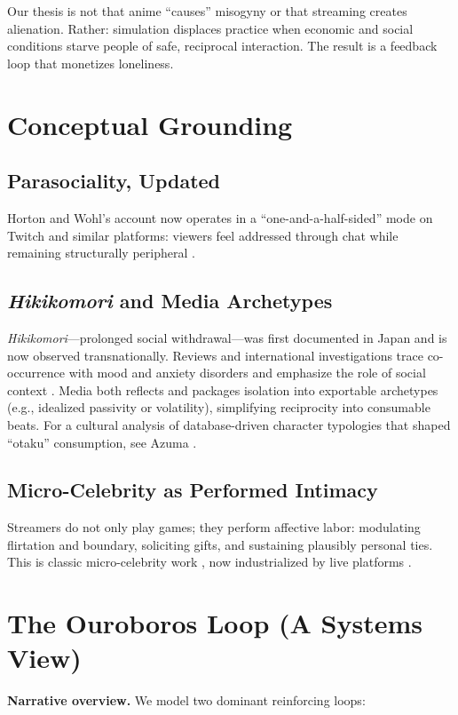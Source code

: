 \documentclass[12pt]{article}
\begin{document}
Our thesis is not that anime ``causes'' misogyny or that streaming creates alienation. Rather: simulation displaces practice when economic and social conditions starve people of safe, reciprocal interaction. The result is a feedback loop that monetizes loneliness.

\section{Conceptual Grounding}

\subsection{Parasociality, Updated}
Horton and Wohl's account now operates in a ``one-and-a-half-sided'' mode on Twitch and similar platforms: viewers feel addressed through chat while remaining structurally peripheral \cite{horton1956,taylor2018}.

\subsection{\emph{Hikikomori} and Media Archetypes}
\emph{Hikikomori}---prolonged social withdrawal---was first documented in Japan and is now observed transnationally. Reviews and international investigations trace co-occurrence with mood and anxiety disorders and emphasize the role of social context \cite{teo2010,kato2012}. Media both reflects and packages isolation into exportable archetypes (e.g., idealized passivity or volatility), simplifying reciprocity into consumable beats. For a cultural analysis of database-driven character typologies that shaped ``otaku'' consumption, see Azuma \cite{azuma2009}.

\subsection{Micro-Celebrity as Performed Intimacy}
Streamers do not only play games; they perform affective labor: modulating flirtation and boundary, soliciting gifts, and sustaining plausibly personal ties. This is classic micro-celebrity work \cite{senft2008,marwickboyd2011}, now industrialized by live platforms \cite{taylor2018}.

\section{The Ouroboros Loop (A Systems View)}

\noindent\textbf{Narrative overview.} We model two dominant reinforcing loops:
\end{document}

